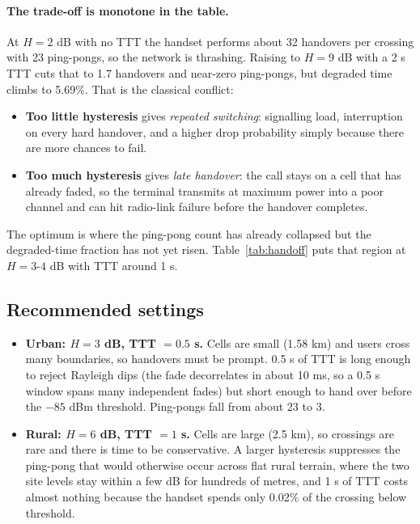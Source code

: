 \documentclass[9pt,a4paper]{extarticle}
\begin{document}
\paragraph{The trade-off is monotone in the table.} At $H=2$ dB with no TTT the handset performs about
32 handovers per crossing with 23 ping-pongs, so the network is thrashing. Raising to $H=9$ dB with
a 2 s TTT cuts that to 1.7 handovers and near-zero ping-pongs, but degraded time climbs to
5.69\%. That is the classical conflict:

\begin{itemize}[leftmargin=1.4em,itemsep=1pt,topsep=2pt]
\item \textbf{Too little hysteresis} gives \emph{repeated switching}: signalling load,
interruption on every hard handover, and a higher drop probability simply because there are more
chances to fail.
\item \textbf{Too much hysteresis} gives \emph{late handover}: the call stays on a cell that has
already faded, so the terminal transmits at maximum power into a poor channel and can hit
radio-link failure before the handover completes.
\end{itemize}

The optimum is where the ping-pong count has already collapsed but the degraded-time fraction has
not yet risen. Table~\ref{tab:handoff} puts that region at $H=3$-$4$ dB with TTT around 1 s.

\subsection{Recommended settings}
\begin{itemize}[leftmargin=1.4em,itemsep=1pt,topsep=2pt]
\item \textbf{Urban: $H=3$ dB, TTT $=0.5$ s.} Cells are small (1.58 km) and users cross many
boundaries, so handovers must be prompt. 0.5 s of TTT is long enough to reject Rayleigh dips (the
fade decorrelates in about 10 ms, so a 0.5 s window spans many independent fades) but short enough
to hand over before the $-85$ dBm threshold. Ping-pongs fall from about 23 to 3.
\item \textbf{Rural: $H=6$ dB, TTT $=1$ s.} Cells are large (2.5 km), so crossings are rare and
there is time to be conservative. A larger hysteresis suppresses the ping-pong that would
otherwise occur across flat rural terrain, where the two site levels stay within a few dB for
hundreds of metres, and 1 s of TTT costs almost nothing because the handset spends only 0.02\% of
the crossing below threshold.
\end{itemize}
\end{document}
